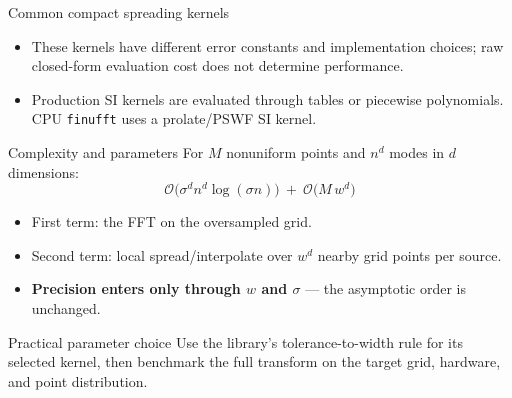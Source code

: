 \documentclass[aspectratio=169,11pt]{beamer}
\newcommand{\cO}{\mathcal{O}}
\newcommand{\hl}[1]{{\color{CCMorange}\textbf{#1}}}
\begin{document}
\begin{frame}{Common compact spreading kernels}
\footnotesize
\begin{center}
\end{center}
\vspace{2mm}
\begin{itemize}
  \item These kernels have different error constants and implementation choices; raw closed-form evaluation cost does not determine performance.
  \item Production SI kernels are evaluated through tables or piecewise polynomials. CPU \texttt{finufft} uses a prolate/PSWF SI kernel.
\end{itemize}
\end{frame}

\begin{frame}{Complexity and parameters}
\small
For \(M\) nonuniform points and \(n^d\) modes in \(d\) dimensions:
\[
  \boxed{\ \cO\big(\sigma^d n^d\log(\sigma n)\big)\ +\ \cO\big(M\,w^d\big)\ }
\]
\begin{itemize}
  \item First term: the FFT on the oversampled grid.
  \item Second term: local spread/interpolate over \(w^d\) nearby grid points per source.
  \item \hl{Precision enters only through \(w\) and \(\sigma\)} --- the asymptotic order is unchanged.
\end{itemize}
\begin{block}{Practical parameter choice}
Use the library's tolerance-to-width rule for its selected kernel, then benchmark the full transform on the target grid, hardware, and point distribution.
\end{block}
\end{frame}
\end{document}
